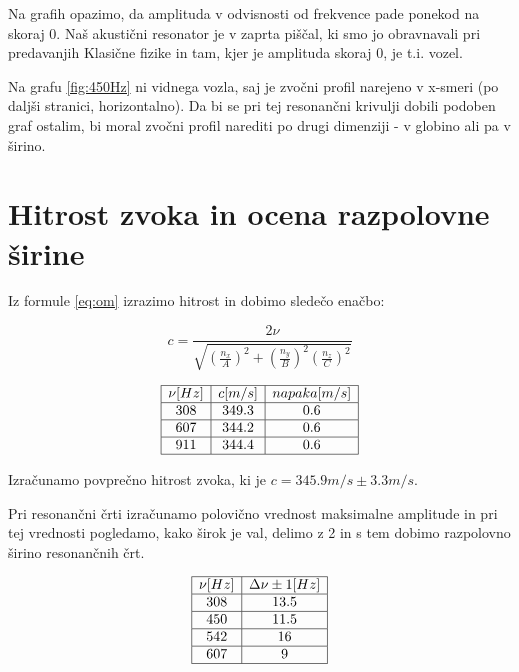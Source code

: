 \documentclass[12pt]{report}
\begin{document}
Na grafih opazimo, da amplituda v odvisnosti od frekvence pade ponekod na skoraj 0. Naš akustični resonator je v zaprta piščal, ki smo jo obravnavali pri predavanjih Klasične fizike in tam, kjer je amplituda skoraj 0, je t.i. vozel. 

Na grafu \ref{fig:450Hz} ni vidnega vozla, saj je zvočni profil narejeno v x-smeri (po daljši stranici, horizontalno). Da bi se pri tej resonančni krivulji dobili podoben graf ostalim, bi moral zvočni profil narediti po drugi dimenziji - v globino ali pa v širino.

\section*{Hitrost zvoka in ocena razpolovne širine}

Iz formule \ref{eq:om} izrazimo hitrost in dobimo sledečo enačbo: 

\begin{equation}
  c = \frac{2\nu}{\sqrt{\left(\frac{n_x}{A}\right)^2 + \left(\frac{n_y}{B}\right)^2 \left(\frac{n_z}{C}\right)^2}}
\end{equation}

\[
  \begin{array}{|c|c|c|} \hline
    \nu [Hz] & c [m/s] & napaka [m/s] \\ \hline
    308 &  349.3 & 0.6 \\ \hline
    607 & 344.2 & 0.6 \\ \hline
    911 & 344.4 & 0.6\\ \hline
  \end{array}  
\]

Izračunamo povprečno hitrost zvoka, ki je $c=345.9m/s \pm 3.3m/s$.

Pri resonančni črti izračunamo polovično vrednost maksimalne amplitude in pri tej vrednosti pogledamo, kako širok je val, delimo z 2 in s tem dobimo razpolovno širino resonančnih črt. 

\[
  \begin{array}{|c|c|}\hline
    \nu[Hz] & \Delta \nu \pm 1 [Hz] \\ \hline
    308 & 13.5  \\ \hline
    450 & 11.5 \\ \hline
    542 & 16 \\ \hline
    607 & 9\\ \hline
  \end{array}
\]
\end{document}

